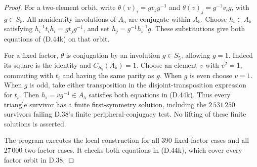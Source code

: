\begin{proof}
For a two-element orbit, write
$\theta(v)_i=g v_jg^{-1}$ and
$\theta(v)_j=g^{-1}v_i g$, with $g\in S_5$.
All nonidentity involutions of $A_5$ are
conjugate within $A_5$.
Choose $h_i\in A_5$ satisfying
$h_i^{-1}t_i h_i=g t_jg^{-1}$, and set
$h_j=g^{-1}h_i^{-1}g$.
These substitutions give both equations
of (D.44k) on that orbit.

For a fixed factor, $\theta$ is conjugation
by an involution $g\in S_5$, allowing $g=1$.
Indeed its square is the identity and
$C_{S_5}(A_5)=1$.
Choose an element $v$ with $v^2=1$, commuting
with $t_i$ and having the same parity as $g$.
When $g$ is even choose $v=1$.
When $g$ is odd, take either transposition
in the disjoint-transposition expression
for $t_i$.
Then $h_i=vg^{-1}\in A_5$ satisfies both
equations in (D.44k).
Thus every triangle survivor has a finite
first-symmetry solution, including the
$2\,531\,250$ survivors failing D.38's
finite peripheral-conjugacy test.
No lifting of these finite solutions is
asserted.

The program
executes the local construction for all
$390$ fixed-factor cases and all
$27\,000$ two-factor cases.
It checks both equations in (D.44k),
which cover every factor orbit in D.38.
\end{proof}
